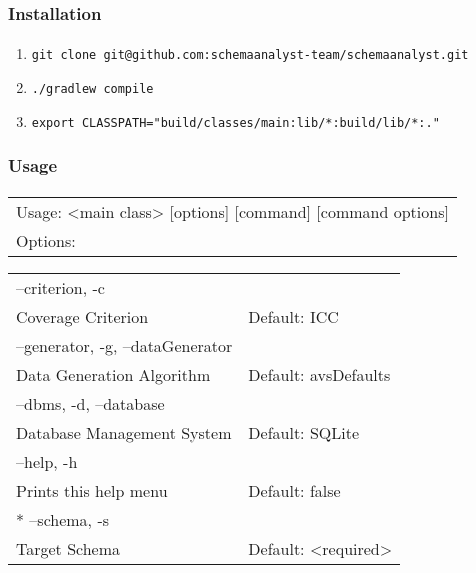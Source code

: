  \begin{frame}
	 \frametitle{Installation}
        \framesubtitle{\mbox{}}
	\setlength{\leftmargini}{1.5em}
        \centering
	\begin{enumerate}
		\item <1-> \texttt{git clone git@github.com:schemaanalyst-team/schemaanalyst.git}
		\item <2-> \texttt{./gradlew compile}
		\item <3-> \texttt{export CLASSPATH="build/classes/main:lib/*:build/lib/*:."}
	\end{enumerate}
 \end{frame}

 \begin{frame}%
        \frametitle{Usage}
        \framesubtitle{\mbox{}}
        \centering
	\begin{tabular}{l}
  \hspace{-2em} Usage: <main class> [options] [command] [command options] \\
  \hspace{-1em} Options: \\
  \end{tabular}
  \begin{tabular}{ll}
   \hspace{0em} --criterion, -c\\
     \hspace{1em}  Coverage Criterion & Default: ICC\\
   \hspace{0em} --generator, -g, --dataGenerator\\
     \hspace{1em}  Data Generation Algorithm & Default: avsDefaults\\
  \hspace{0em}  --dbms, -d, --database\\
  \hspace{1em}    Database Management System & Default: SQLite\\
   \hspace{0em} --help, -h\\
   \hspace{1em}    Prints this help menu & Default: false\\
\hspace{0em}  * --schema, -s\\
\hspace{1em}     Target Schema & Default: <required>
	\end{tabular}
\end{frame}

